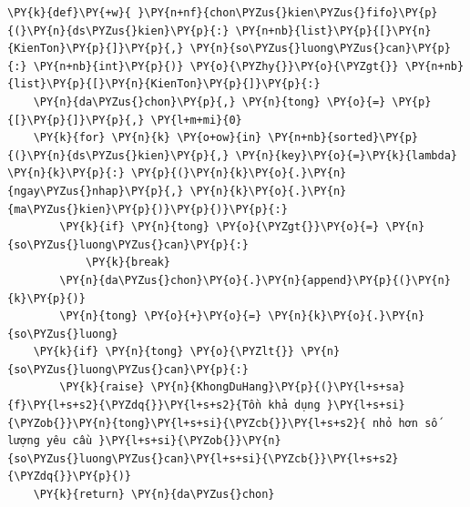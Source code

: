 \begin{Verbatim}[commandchars=\\\{\},frame=single,framerule=0.3pt,rulecolor=\color{black!40},fontsize=\footnotesize,breaklines=true]
\PY{k}{def}\PY{+w}{ }\PY{n+nf}{chon\PYZus{}kien\PYZus{}fifo}\PY{p}{(}\PY{n}{ds\PYZus{}kien}\PY{p}{:} \PY{n+nb}{list}\PY{p}{[}\PY{n}{KienTon}\PY{p}{]}\PY{p}{,} \PY{n}{so\PYZus{}luong\PYZus{}can}\PY{p}{:} \PY{n+nb}{int}\PY{p}{)} \PY{o}{\PYZhy{}}\PY{o}{\PYZgt{}} \PY{n+nb}{list}\PY{p}{[}\PY{n}{KienTon}\PY{p}{]}\PY{p}{:}
    \PY{n}{da\PYZus{}chon}\PY{p}{,} \PY{n}{tong} \PY{o}{=} \PY{p}{[}\PY{p}{]}\PY{p}{,} \PY{l+m+mi}{0}
    \PY{k}{for} \PY{n}{k} \PY{o+ow}{in} \PY{n+nb}{sorted}\PY{p}{(}\PY{n}{ds\PYZus{}kien}\PY{p}{,} \PY{n}{key}\PY{o}{=}\PY{k}{lambda} \PY{n}{k}\PY{p}{:} \PY{p}{(}\PY{n}{k}\PY{o}{.}\PY{n}{ngay\PYZus{}nhap}\PY{p}{,} \PY{n}{k}\PY{o}{.}\PY{n}{ma\PYZus{}kien}\PY{p}{)}\PY{p}{)}\PY{p}{:}
        \PY{k}{if} \PY{n}{tong} \PY{o}{\PYZgt{}}\PY{o}{=} \PY{n}{so\PYZus{}luong\PYZus{}can}\PY{p}{:}
            \PY{k}{break}
        \PY{n}{da\PYZus{}chon}\PY{o}{.}\PY{n}{append}\PY{p}{(}\PY{n}{k}\PY{p}{)}
        \PY{n}{tong} \PY{o}{+}\PY{o}{=} \PY{n}{k}\PY{o}{.}\PY{n}{so\PYZus{}luong}
    \PY{k}{if} \PY{n}{tong} \PY{o}{\PYZlt{}} \PY{n}{so\PYZus{}luong\PYZus{}can}\PY{p}{:}
        \PY{k}{raise} \PY{n}{KhongDuHang}\PY{p}{(}\PY{l+s+sa}{f}\PY{l+s+s2}{\PYZdq{}}\PY{l+s+s2}{Tồn khả dụng }\PY{l+s+si}{\PYZob{}}\PY{n}{tong}\PY{l+s+si}{\PYZcb{}}\PY{l+s+s2}{ nhỏ hơn số lượng yêu cầu }\PY{l+s+si}{\PYZob{}}\PY{n}{so\PYZus{}luong\PYZus{}can}\PY{l+s+si}{\PYZcb{}}\PY{l+s+s2}{\PYZdq{}}\PY{p}{)}
    \PY{k}{return} \PY{n}{da\PYZus{}chon}
\end{Verbatim}

